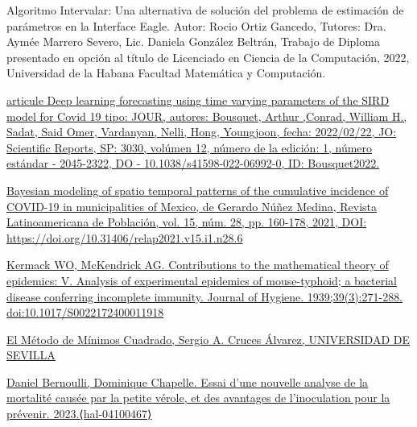 \documentclass{article}
\begin{document}
\begin{itemize}

    \begin{thebibliography}

      {Algoritmo Intervalar: Una alternativa de solución del problema de estimación de parámetros en la Interface Eagle. Autor: Rocio Ortiz Gancedo, Tutores: Dra. Aymée Marrero Severo, Lic. Daniela González Beltrán, Trabajo de Diploma presentado en opción al título de Licenciado en Ciencia de la Computación, 2022, Universidad de la Habana Facultad Matemática y Computación.}
     \label{sec:1}

    \bibitem[2]{}\href{https://doi.org/10.1038/s41598-022-06992-0}{ articule Deep learning forecasting using time varying parameters of the SIRD model for Covid 19 tipo: JOUR, autores: Bousquet, Arthur ,Conrad, William H., Sadat, Said Omer, Vardanyan, Nelli, Hong, Youngjoon, fecha: 2022/02/22, JO: Scientific Reports, SP: 3030, volúmen 12, número de la edición: 1, número estándar   - 2045-2322, DO  - 10.1038/s41598-022-06992-0, ID: Bousquet2022.}
     \label{sec:2}

    \bibitem[3]{}  \href{https://www.redalyc.org/journal/3238/323864536006/html/}{Bayesian modeling of spatio temporal patterns of the cumulative incidence of COVID-19 in municipalities of Mexico, de Gerardo Núñez Medina, \href{https://revistarelap.org/index.php/relap}{ Revista Latinoamericana de Población}, vol. 15, núm. 28, pp. 160-178, 2021, DOI:  https://doi.org/10.31406/relap2021.v15.i1.n28.6}
      \label{sec:3}

    \bibitem[4]{}\href{https://www.semanticscholar.org/paper/Contributions-to-the-mathematical-theory-of-V.-of-a-Kermack-Mckendrick/7beba9b40b692c2daa9975861394aefddcbe602b}{ Kermack WO, McKendrick AG. Contributions to the mathematical theory of epidemics: V. Analysis of experimental epidemics of mouse-typhoid; a bacterial disease conferring incomplete immunity. Journal of Hygiene. 1939;39(3):271-288. doi:10.1017/S0022172400011918}
\label{sec:4}

    \bibitem[5]{}\href{https://personal.us.es/sergio/PDocente/lectura.pdf}{El Método de Mínimos Cuadrado, Sergio A. Cruces Álvarez, UNIVERSIDAD DE SEVILLA}
     \label{sec:5}

    \bibitem[6]{}\href{https://inria.hal.science/hal-04100467}{Daniel Bernoulli, Dominique Chapelle. Essai d'une nouvelle analyse de la mortalité causée par la petite vérole, et des avantages de l'inoculation pour la prévenir. 2023.⟨hal-04100467⟩}
\label{sec:6}


\end{thebibliography}
\end{itemize}
\end{document}
